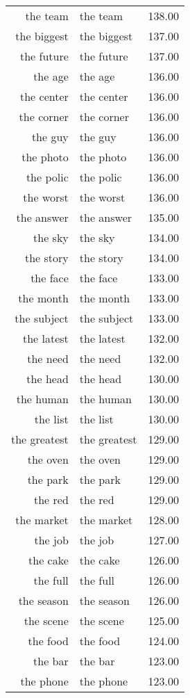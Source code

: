 \begin{table}[ht]
\begin{tabular}{rlr}
  the team & the team & 138.00 \\ 
  the biggest & the biggest & 137.00 \\ 
  the future & the future & 137.00 \\ 
  the age & the age & 136.00 \\ 
  the center & the center & 136.00 \\ 
  the corner & the corner & 136.00 \\ 
  the guy & the guy & 136.00 \\ 
  the photo & the photo & 136.00 \\ 
  the polic & the polic & 136.00 \\ 
  the worst & the worst & 136.00 \\ 
  the answer & the answer & 135.00 \\ 
  the sky & the sky & 134.00 \\ 
  the story & the story & 134.00 \\ 
  the face & the face & 133.00 \\ 
  the month & the month & 133.00 \\ 
  the subject & the subject & 133.00 \\ 
  the latest & the latest & 132.00 \\ 
  the need & the need & 132.00 \\ 
  the head & the head & 130.00 \\ 
  the human & the human & 130.00 \\ 
  the list & the list & 130.00 \\ 
  the greatest & the greatest & 129.00 \\ 
  the oven & the oven & 129.00 \\ 
  the park & the park & 129.00 \\ 
  the red & the red & 129.00 \\ 
  the market & the market & 128.00 \\ 
  the job & the job & 127.00 \\ 
  the cake & the cake & 126.00 \\ 
  the full & the full & 126.00 \\ 
  the season & the season & 126.00 \\ 
  the scene & the scene & 125.00 \\ 
  the food & the food & 124.00 \\ 
  the bar & the bar & 123.00 \\ 
  the phone & the phone & 123.00 \\ 

\end{tabular}
\end{table}
